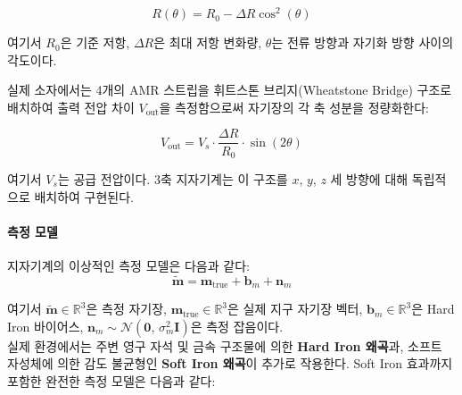                 \begin{equation}
                    R(\theta) = R_0 - \Delta R \cos^2(\theta)
                    \label{eq:amr_resistance}
                \end{equation}

                \noindent 여기서 $R_0$은 기준 저항, $\Delta R$은 최대 저항 변화량,
                $\theta$는 전류 방향과 자기화 방향 사이의 각도이다.

                실제 소자에서는 4개의 AMR 스트립을 휘트스톤 브리지(Wheatstone Bridge) 구조로 배치하여
                출력 전압 차이 $V_{\text{out}}$을 측정함으로써 자기장의 각 축 성분을 정량화한다:

                \begin{equation}
                    V_{\text{out}} = V_s \cdot \frac{\Delta R}{R_0} \cdot \sin(2\theta)
                    \label{eq:wheatstone}
                \end{equation}

                \noindent 여기서 $V_s$는 공급 전압이다. 3축 지자기계는 이 구조를 $x$, $y$, $z$ 세 방향에 대해 독립적으로 배치하여 구현된다.\\

            \paragraph{측정 모델}
                지자기계의 이상적인 측정 모델은 다음과 같다:\\

                \begin{equation}
                    \tilde{\mathbf{m}} = \mathbf{m}_{\text{true}} + \mathbf{b}_m + \mathbf{n}_m
                    \label{eq:mag_model_ideal}
                \end{equation}

                \noindent 여기서 $\tilde{\mathbf{m}} \in \mathbb{R}^3$은 측정 자기장, $\mathbf{m}_{\text{true}} \in \mathbb{R}^3$은 실제 지구 자기장 벡터, $\mathbf{b}_m \in \mathbb{R}^3$은 Hard Iron 바이어스, $\mathbf{n}_m \sim \mathcal{N}(\mathbf{0},\, \sigma_m^2 \mathbf{I})$은 측정 잡음이다.\\

                실제 환경에서는 주변 영구 자석 및 금속 구조물에 의한 \textbf{Hard Iron 왜곡}과, 소프트 자성체에 의한 감도 불균형인 \textbf{Soft Iron 왜곡}이 추가로 작용한다. Soft Iron 효과까지 포함한 완전한 측정 모델은 다음과 같다:\\

